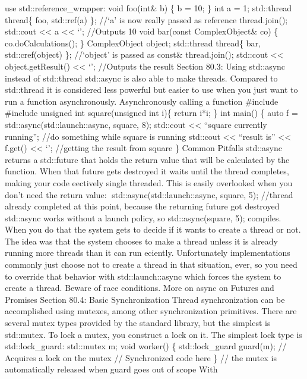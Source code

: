 use std::reference\_wrapper: void foo(int\& b) \{ b = 10; \} int a = 1;
std::thread thread\{ foo, std::ref(a) \}; //`a' is now really passed as
reference thread.join(); std::cout \textless\textless{} a
\textless\textless{} `\n'; //Outputs 10 void bar(const ComplexObject\&
co) \{ co.doCalculations(); \} ComplexObject object; std::thread
thread\{ bar, std::cref(object) \}; //`object' is passed as const\&
thread.join(); std::cout \textless\textless{} object.getResult()
\textless\textless{} `\n'; //Outputs the result Section 80.3: Using
std::async instead of std::thread std::async is also able to make
threads. Compared to std::thread it is considered less powerful but
easier to use when you just want to run a function asynchronously.
Asynchronously calling a function \#include \#include unsigned int
square(unsigned int i)\{ return i*i; \} int main() \{ auto f =
std::async(std::launch::async, square, 8); std::cout
\textless\textless{} ``square currently running\n''; //do something
while square is running std::cout \textless\textless{} ``result is''
\textless\textless{} f.get() \textless\textless{} `\n'; //getting the
result from square \} Common Pitfalls std::async returns a std::future
that holds the return value that will be calculated by the function.
When that future gets destroyed it waits until the thread completes,
making your code eectively single threaded. This is easily overlooked
when you don't need the return value: std::async(std::launch::async,
square, 5); //thread already completed at this point, because the
returning future got destroyed std::async works without a launch policy,
so std::async(square, 5); compiles. When you do that the system gets to
decide if it wants to create a thread or not. The idea was that the
system chooses to make a thread unless it is already running more
threads than it can run eciently. Unfortunately implementations commonly
just choose not to create a thread in that situation, ever, so you need
to override that behavior with std::launch::async which forces the
system to create a thread. Beware of race conditions. More on async on
Futures and Promises Section 80.4: Basic Synchronization Thread
synchronization can be accomplished using mutexes, among other
synchronization primitives. There are several mutex types provided by
the standard library, but the simplest is std::mutex. To lock a mutex,
you construct a lock on it. The simplest lock type is std::lock\_guard:
std::mutex m; void worker() \{ std::lock\_guard guard(m); // Acquires a
lock on the mutex // Synchronized code here \} // the mutex is
automatically released when guard goes out of scope With
